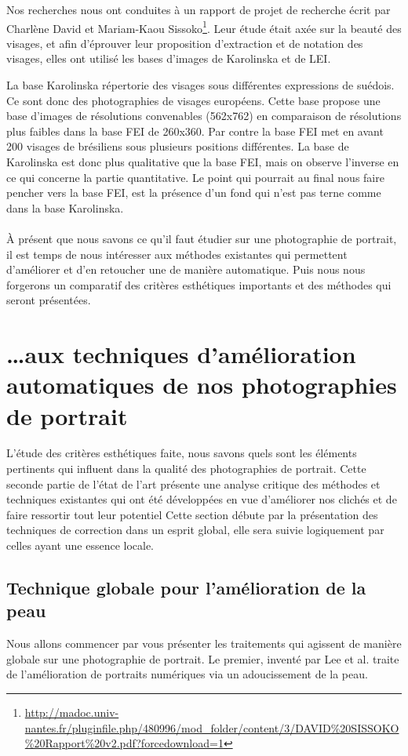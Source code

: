 \documentclass[11pt, french]{report-rd-info}
\begin{document}
Nos recherches nous ont conduites à un rapport de projet de recherche écrit par Charlène David et Mariam-Kaou Sissoko\footnote{\url{http://madoc.univ-nantes.fr/pluginfile.php/480996/mod_folder/content/3/DAVID\%20SISSOKO\%20Rapport\%20v2.pdf?forcedownload=1}}. Leur étude était axée sur la beauté des visages, et afin d'éprouver leur proposition d'extraction et de notation des visages, elles ont utilisé les bases d'images de Karolinska et de LEI.

La base Karolinska répertorie des visages sous différentes expressions de suédois. Ce sont donc des photographies de visages européens. Cette base propose une base d'images de résolutions convenables (562x762) en comparaison de résolutions plus faibles dans la base FEI de 260x360. Par contre la base FEI met en avant 200 visages de brésiliens sous plusieurs positions différentes. La base de Karolinska est donc plus qualitative que la base FEI, mais on observe l'inverse en ce qui concerne la partie quantitative. Le point qui pourrait au final nous faire pencher vers la base FEI, est la présence d'un fond qui n'est pas terne comme dans la base Karolinska.
\paragraph*{}
À présent que nous savons ce qu'il faut étudier sur une photographie de portrait, il est temps de nous intéresser aux méthodes existantes qui permettent d'améliorer et d’en retoucher une de manière automatique. Puis nous nous forgerons un comparatif des critères esthétiques importants et des méthodes qui seront présentées.

\section{\ldots aux techniques d’amélioration automatiques de nos photographies de portrait}
L’étude des critères esthétiques faite, nous savons quels sont les éléments pertinents qui influent dans la qualité des photographies de portrait. Cette seconde partie de l’état de l’art présente une analyse critique des méthodes et techniques existantes qui ont été développées en vue d’améliorer nos clichés et de faire ressortir tout leur potentiel
Cette section débute par la présentation des techniques de correction dans un esprit global, elle sera suivie logiquement par celles ayant une essence locale.
\subsection{Technique globale pour l’amélioration de la peau}
Nous allons commencer par vous présenter les traitements qui agissent de manière globale sur une photographie de portrait. Le premier, inventé par Lee et al. \cite{Lee} traite de l'amélioration de portraits numériques via un adoucissement de la peau.
\end{document}
